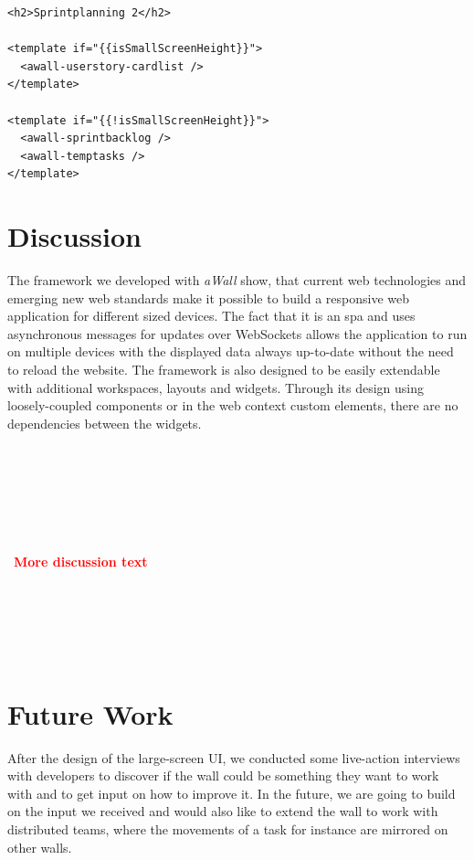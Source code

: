 \documentclass{sigchi}
\newcommand\todo[1]{~\\\\~\\~\\~\\~\\~\textbf{\huge{\textcolor{red}{#1}}}\\~\\~\\~\\~\\~}
\begin{document}
\begin{lstlisting}
<h2>Sprintplanning 2</h2>

<template if="{{isSmallScreenHeight}}">
  <awall-userstory-cardlist />
</template>

<template if="{{!isSmallScreenHeight}}">
  <awall-sprintbacklog />
  <awall-temptasks />
</template>
\end{lstlisting}


\section{Discussion}

The framework we developed with \textit{aWall} show, that current web technologies and emerging new web standards make it possible to build a responsive web application for different sized devices. 
The fact that it is an \gls{spa} and uses asynchronous messages for updates over WebSockets allows the application to run on multiple devices with the displayed data always up-to-date without the need to reload the website.
The framework is also designed to be easily extendable with additional workspaces, layouts and widgets.
Through its design using loosely-coupled components or in the web context custom elements, there are no dependencies between the widgets.

\todo{More discussion text}

\section{Future Work}
After the design of the large-screen UI, we conducted some live-action interviews with developers to discover if the wall could be something they want to work with and to get input on how to improve it.
In the future, we are going to build on the input we received and would also like to extend the wall to work with distributed teams, where the movements  of a task for instance are mirrored on other walls.



\balance{}



\end{document}
